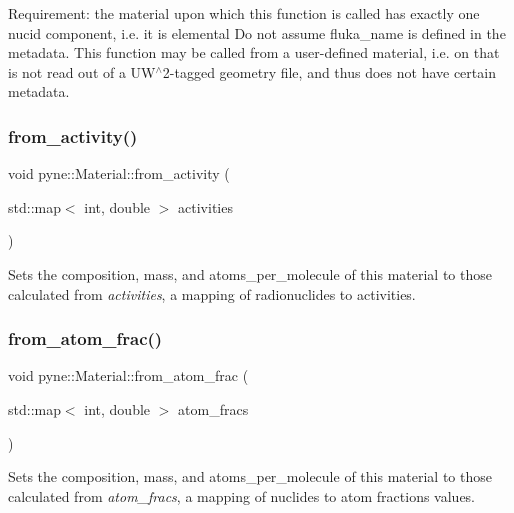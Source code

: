 Requirement\+: the material upon which this function is called has exactly one nucid component, i.\+e. it is elemental Do not assume fluka\+\_\+name is defined in the metadata. This function may be called from a user-\/defined material, i.\+e. on that is not read out of a U\+W$^\wedge$2-\/tagged geometry file, and thus does not have certain metadata. \mbox{\label{classpyne_1_1_material_a72d3e72ef2a639575b721186a4afdf62}} 
\subsubsection{\texorpdfstring{from\+\_\+activity()}{from\_activity()}}
{\footnotesize\ttfamily void pyne\+::\+Material\+::from\+\_\+activity (\begin{DoxyParamCaption}\item[{std\+::map$<$ int, double $>$}]{activities }\end{DoxyParamCaption})}

Sets the composition, mass, and atoms\+\_\+per\+\_\+molecule of this material to those calculated from {\itshape activities}, a mapping of radionuclides to activities. \mbox{\label{classpyne_1_1_material_a2db9572599c20eb0d17bd0993766f792}} 
\subsubsection{\texorpdfstring{from\+\_\+atom\+\_\+frac()}{from\_atom\_frac()}}
{\footnotesize\ttfamily void pyne\+::\+Material\+::from\+\_\+atom\+\_\+frac (\begin{DoxyParamCaption}\item[{std\+::map$<$ int, double $>$}]{atom\+\_\+fracs }\end{DoxyParamCaption})}

Sets the composition, mass, and atoms\+\_\+per\+\_\+molecule of this material to those calculated from {\itshape atom\+\_\+fracs}, a mapping of nuclides to atom fractions values. \mbox{\label{classpyne_1_1_material_a8f06385fde86492d1291b35fa982c753}} 
